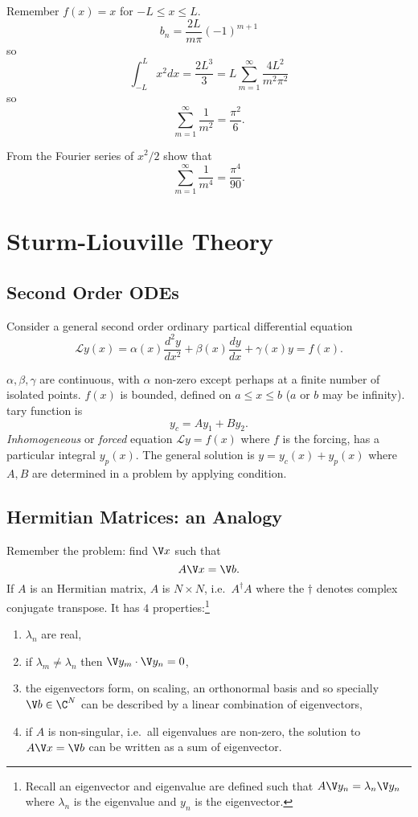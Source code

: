 \documentclass[a4paper]{article}
\renewcommand*\L{\mathcal{L}}
\begin{document}
\begin{eg}
  Remember \(f(x)=x\) for \(-L\leq x\leq L\).
  \[
    b_n = \frac{2L}{m\pi}(-1)^{m+1}
  \]
  so
  \[
    \int_{-L}^{L} x^2 dx = \frac{2L^3}{3} = L \sum_{m=1}^{\infty}\frac{4L^2}{m^2\pi^2}
  \]
  so
  \[
    \sum_{m=1}^{\infty}\frac{1}{m^2} = \frac{\pi^2}{6}.
  \]
\end{eg}

\begin{ex}
  From the Fourier series of \(x^2/2\) show that
  \[
    \sum_{m=1}^{\infty}\frac{1}{m^4} = \frac{\pi^4}{90}.
  \]
\end{ex}

\section{Sturm-Liouville Theory}

\subsection{Second Order ODEs}

Consider a general second order ordinary partical differential equation
\[
  \L y(x) = \alpha(x) \frac{d^2y}{dx^2} + \beta(x) \frac{dy}{dx} + \gamma(x) y = f(x).
\]

\(\alpha,\beta,\gamma\) are continuous, with \(\alpha\) non-zero except perhaps at a finite number of isolated points. \(f(x)\) is bounded, defined on \(a\leq x\leq b\) (\(a\) or \(b\) may be infinity).
tary function is \[
  y_c=Ay_1+By_2.
\]
\emph{Inhomogeneous} or \emph{forced} equation \(\L y = f(x)\) where \(f\) is the forcing, has a particular integral \(y_p(x)\). The general solution is \(y=y_c(x)+y_p(x)\) where \(A,B\) are determined in a problem by applying condition.

\subsection{Hermitian Matrices: an Analogy}

Remember the problem: find \(\V x \) such that
\[
A \V x = \V b.
\]
If \(A\) is an Hermitian matrix, \(A\) is \(N \times N\), i.e.\ \(A^\dag A\) where the \(\dag\) denotes complex conjugate transpose. It has \(4\) properties:\footnote{Recall an eigenvector and eigenvalue are defined such that \(A \V y_n = \lambda_n \V y_n\) where \(\lambda_n\) is the eigenvalue and \(y_n\) is the eigenvector.}
\begin{enumerate}
\item \(\lambda_n\) are real,
\item if \(\lambda_m\neq\lambda_n\) then \(\V y_m\cdot\V y_n=0\),
\item the eigenvectors form, on scaling, an orthonormal basis and so specially \(\V b \in \C^N\) can be described by a linear combination of eigenvectors,
\item if \(A\) is non-singular, i.e.\ all eigenvalues are non-zero, the solution to \(A\V x = \V b\) can be written as a sum of eigenvector.
\end{enumerate}
\end{document}
